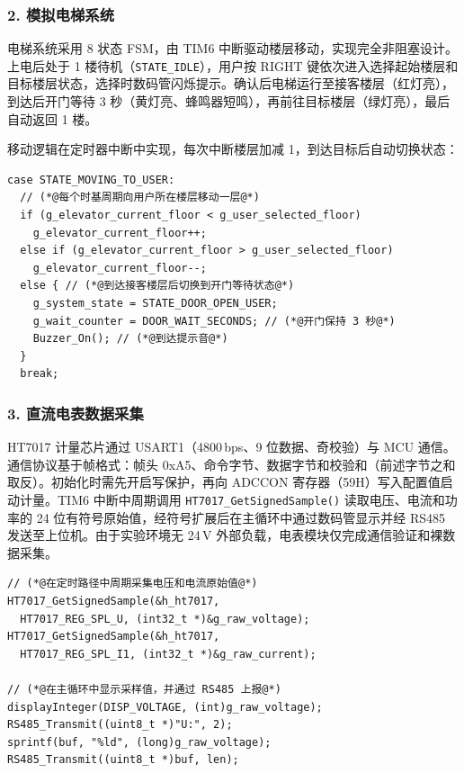 \documentclass[a4paper,12pt,fontset=windows]{ctexart}
\begin{document}
\subsubsection*{2. 模拟电梯系统}

\begin{sloppypar}
电梯系统采用 8 状态 FSM，由 TIM6 中断驱动楼层移动，实现完全非阻塞设计。上电后处于 1 楼待机（\texttt{STATE\_IDLE}），用户按 RIGHT 键依次进入选择起始楼层和目标楼层状态，选择时数码管闪烁提示。确认后电梯运行至接客楼层（红灯亮），到达后开门等待 3 秒（黄灯亮、蜂鸣器短鸣），再前往目标楼层（绿灯亮），最后自动返回 1 楼。
\end{sloppypar}

移动逻辑在定时器中断中实现，每次中断楼层加减 1，到达目标后自动切换状态：

\begin{lstlisting}
case STATE_MOVING_TO_USER:
  // (*@每个时基周期向用户所在楼层移动一层@*)
  if (g_elevator_current_floor < g_user_selected_floor)
    g_elevator_current_floor++;
  else if (g_elevator_current_floor > g_user_selected_floor)
    g_elevator_current_floor--;
  else { // (*@到达接客楼层后切换到开门等待状态@*)
    g_system_state = STATE_DOOR_OPEN_USER;
    g_wait_counter = DOOR_WAIT_SECONDS; // (*@开门保持 3 秒@*)
    Buzzer_On(); // (*@到达提示音@*)
  }
  break;
\end{lstlisting}

\subsubsection*{3. 直流电表数据采集}

\begin{sloppypar}
HT7017 计量芯片通过 USART1（4800\,bps、9 位数据、奇校验）与 MCU 通信。通信协议基于帧格式：帧头 0xA5、命令字节、数据字节和校验和（前述字节之和取反）。初始化时需先开启写保护，再向 ADCCON 寄存器（59H）写入配置值启动计量。TIM6 中断中周期调用 \texttt{HT7017\_GetSignedSample()} 读取电压、电流和功率的 24 位有符号原始值，经符号扩展后在主循环中通过数码管显示并经 RS485 发送至上位机。由于实验环境无 24\,V 外部负载，电表模块仅完成通信验证和裸数据采集。
\end{sloppypar}

\begin{lstlisting}
// (*@在定时路径中周期采集电压和电流原始值@*)
HT7017_GetSignedSample(&h_ht7017,
  HT7017_REG_SPL_U, (int32_t *)&g_raw_voltage);
HT7017_GetSignedSample(&h_ht7017,
  HT7017_REG_SPL_I1, (int32_t *)&g_raw_current);

// (*@在主循环中显示采样值，并通过 RS485 上报@*)
displayInteger(DISP_VOLTAGE, (int)g_raw_voltage);
RS485_Transmit((uint8_t *)"U:", 2);
sprintf(buf, "%ld", (long)g_raw_voltage);
RS485_Transmit((uint8_t *)buf, len);
\end{lstlisting}
\end{document}
